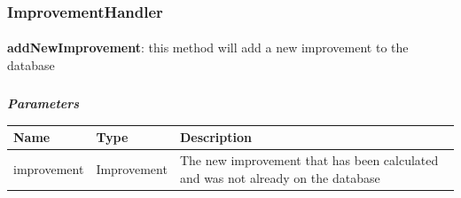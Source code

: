 				\subsubsection{ImprovementHandler}
					\paragraph{}
							\textbf{addNewImprovement}: this method will add a new improvement to the database
							\subparagraph{}
							\vspace{-3mm}
							\textit{\textbf{Parameters}}
							\vspace{-2mm}
								\begin{table}[!h]
									\begin{tabular}{L{0.2\textwidth}L{0.2\textwidth}L{0.4\textwidth}}
										\toprule
										\textbf{Name} & \textbf{Type} & \textbf{Description} \\
										\midrule
								  		improvement & Improvement & The new improvement that has been calculated and was not already on the database \\
								 		\bottomrule
									\end{tabular}
								\end{table}
								
